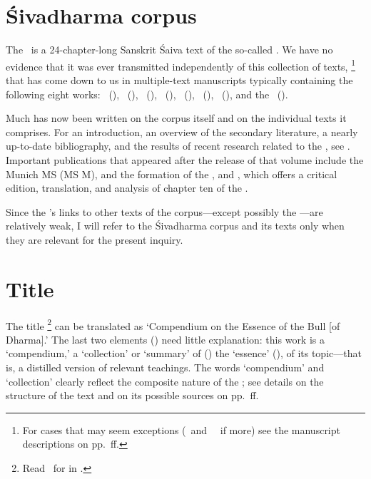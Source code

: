 

\thispagestyle{empty}
\frenchspacing

\section{Śivadharma corpus}
\fancyhead[LE]{}
\fancyhead[RE]{}
\fancyhead[LO]{}
\fancyhead[RO]{}

The \Vss\ is a 24-chapter-long Sanskrit Śaiva text of the 
so-called \Sivadharmacorpus.  We have no evidence that it
was ever transmitted independently of this collection of texts,%
		\footnote{For cases that may seem exceptions 
		(\msKoa\ and \msPaperA\ \CHECK\ if more)
                see the manuscript descriptions
                on pp.~\pageref{mss_descr}ff.}
that has come down to us in multiple-text manuscripts typically containing the following eight works:
\SDhS\ (\SDHS), \SDhU\ (\SDHU), \SDhSangr\ (\SDHSANGR),
\Ums\ (\UMS), \Uums\ (\UUMS), \Vss\ (\VSS), \DharmP\ (\DHARMP), and the \SivaUp\ (\SIVAUP).

Much has now been written on the corpus itself and on the individual texts it comprises. 
For an introduction, an overview of the secondary literature, 
a nearly up-to-date bibliography, and the results of recent research related to the \Sivadharma,
see . Important publications that appeared after the release of that volume
include  the Munich MS (MS M), and the formation of the \Sivadharmacorpus,
and , which offers a critical edition, translation, and analysis of chapter ten of the 
\SDhS.


Since the \VSS's links to other texts of the corpus---except possibly the 
\DharmP---are relatively weak, I will refer to the Śivadharma corpus and
its texts only when they are relevant for the present inquiry.



\section{Title}\label{title}
The title \Vss%
	\footnote{Read \Vss\ for 
	in .}
can be translated as `Compendium on the Essence of the Bull [of Dharma].'
The last two elements () need
little explanation: this work is a `compendium,' a `collection' or `summary' of ()
the `essence' (), of its topic---that is, a distilled version of relevant teachings.
The words `compendium' and `collection' clearly reflect the composite nature of
the \VSS; see details on the structure of the text and
on its possible sources on pp.~\pageref{structure}ff.

